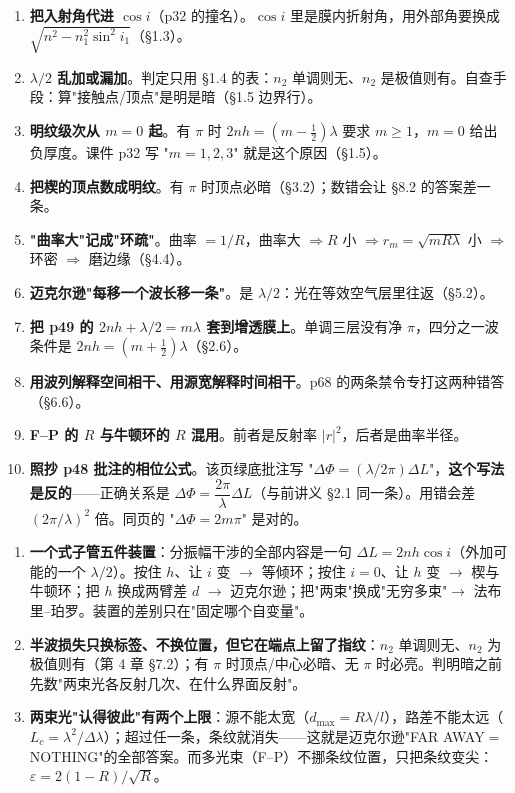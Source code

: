 \documentclass[10pt]{ctexart}
\begin{document}
\begin{enumerate}
\item \textbf{把入射角代进 $\cos i$}（p32 的撞名）。$\cos i$ 里是膜内折射角，用外部角要换成 $\sqrt{n^2-n_1^2\sin^2i_1}$（\S1.3）。
\item \textbf{$\lambda/2$ 乱加或漏加}。判定只用 \S1.4 的表：$n_2$ 单调则无、$n_2$ 是极值则有。自查手段：算"接触点/顶点"是明是暗（\S1.5 边界行）。
\item \textbf{明纹级次从 $m=0$ 起}。有 $\pi$ 时 $2nh=(m-\frac12)\lambda$ 要求 $m\ge1$，$m=0$ 给出负厚度。课件 p32 写 "$m=1,2,3$" 就是这个原因（\S1.5）。
\item \textbf{把楔的顶点数成明纹}。有 $\pi$ 时顶点必暗（\S3.2）；数错会让 \S8.2 的答案差一条。
\item \textbf{"曲率大"记成"环疏"}。曲率 $=1/R$，曲率大 $\Rightarrow R$ 小 $\Rightarrow r_m=\sqrt{mR\lambda}$ 小 $\Rightarrow$ 环密 $\Rightarrow$ 磨边缘（\S4.4）。
\item \textbf{迈克尔逊"每移一个波长移一条"}。是 $\lambda/2$：光在等效空气层里往返（\S5.2）。
\item \textbf{把 p49 的 $2nh+\lambda/2=m\lambda$ 套到增透膜上}。单调三层没有净 $\pi$，四分之一波条件是 $2nh=(m+\frac12)\lambda$（\S2.6）。
\item \textbf{用波列解释空间相干、用源宽解释时间相干}。p68 的两条禁令专打这两种错答（\S6.6）。
\item \textbf{F--P 的 $R$ 与牛顿环的 $R$ 混用}。前者是反射率 $|r|^2$，后者是曲率半径。
\item \textbf{照抄 p48 批注的相位公式}。该页绿底批注写 "$\Delta\Phi=(\lambda/2\pi)\Delta L$"，\textbf{这个写法是反的}——正确关系是 $\Delta\Phi=\dfrac{2\pi}{\lambda}\Delta L$（与前讲义 \S2.1 同一条）。用错会差 $(2\pi/\lambda)^2$ 倍。同页的 "$\Delta\Phi=2m\pi$" 是对的。
\end{enumerate}

\flowerrule


\begin{enumerate}
\item \textbf{一个式子管五件装置}：分振幅干涉的全部内容是一句 $\Delta L=2nh\cos i$（外加可能的一个 $\lambda/2$）。按住 $h$、让 $i$ 变 $\to$ 等倾环；按住 $i=0$、让 $h$ 变 $\to$ 楔与牛顿环；把 $h$ 换成两臂差 $d$ $\to$ 迈克尔逊；把"两束"换成"无穷多束"$\to$ 法布里--珀罗。装置的差别只在"固定哪个自变量"。
\item \textbf{半波损失只换标签、不换位置，但它在端点上留了指纹}：$n_2$ 单调则无、$n_2$ 为极值则有（第 4 章 \S7.2）；有 $\pi$ 时顶点/中心必暗、无 $\pi$ 时必亮。判明暗之前先数"两束光各反射几次、在什么界面反射"。
\item \textbf{两束光"认得彼此"有两个上限}：源不能太宽（$d_{\max}=R\lambda/l$），路差不能太远（$L_c=\lambda^2/\Delta\lambda$）；超过任一条，条纹就消失——这就是迈克尔逊"FAR AWAY$=$NOTHING"的全部答案。而多光束（F--P）不挪条纹位置，只把条纹变尖：$\varepsilon=2(1-R)/\sqrt R$。
\end{enumerate}
\end{document}
